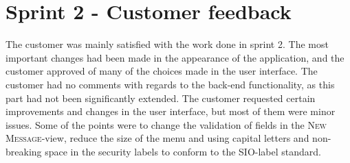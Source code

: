 \section{Sprint 2 - Customer feedback}
The customer was mainly satisfied with the work done in sprint 2. The most important changes had been made in the appearance of the application, and the customer approved of many of the choices made in the user interface. The customer had no comments with regards to the back-end functionality, as this part had not been significantly extended. 
\newline
\newline
The customer requested certain improvements and changes in the user interface, but most of them were minor issues. Some of the points were to change the validation of fields in the \textsc{New Message}-view, reduce the size of the menu and using capital letters and non-breaking space in the security labels to conform to the SIO-label standard.